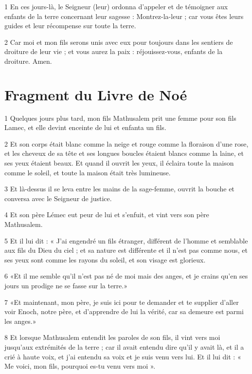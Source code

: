 
\par 1 En ces jours-là, le Seigneur (leur) ordonna d'appeler et de témoigner aux enfants de la terre concernant leur sagesse : Montrez-la-leur ; car vous êtes leurs guides et leur récompense sur toute la terre.
\par 2 Car moi et mon fils serons unis avec eux pour toujours dans les sentiers de droiture de leur vie ; et vous aurez la paix : réjouissez-vous, enfants de la droiture. Amen.

\part{Fragment du Livre de Noé}


\par 1 Quelques jours plus tard, mon fils Mathusalem prit une femme pour son fils Lamec, et elle devint enceinte de lui et enfanta un fils.
\par 2 Et son corps était blanc comme la neige et rouge comme la floraison d'une rose, et les cheveux de sa tête et ses longues boucles étaient blancs comme la laine, et ses yeux étaient beaux. Et quand il ouvrit les yeux, il éclaira toute la maison comme le soleil, et toute la maison était très lumineuse.
\par 3 Et là-dessus il se leva entre les mains de la sage-femme, ouvrit la bouche et conversa avec le Seigneur de justice.
\par 4 Et son père Lémec eut peur de lui et s'enfuit, et vint vers son père Mathusalem.
\par 5 Et il lui dit : « J'ai engendré un fils étranger, différent de l'homme et semblable aux fils du Dieu du ciel ; et sa nature est différente et il n'est pas comme nous, et ses yeux sont comme les rayons du soleil, et son visage est glorieux.
\par 6 «Et il me semble qu'il n'est pas né de moi mais des anges, et je crains qu'en ses jours un prodige ne se fasse sur la terre.»
\par 7 «Et maintenant, mon père, je suis ici pour te demander et te supplier d'aller voir Enoch, notre père, et d'apprendre de lui la vérité, car sa demeure est parmi les anges.»
\par 8 Et lorsque Mathusalem entendit les paroles de son fils, il vint vers moi jusqu'aux extrémités de la terre ; car il avait entendu dire qu'il y avait là, et il a crié à haute voix, et j'ai entendu sa voix et je suis venu vers lui. Et il lui dit : « Me voici, mon fils, pourquoi es-tu venu vers moi ».

